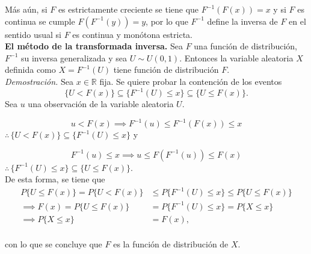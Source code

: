 \documentclass[10pt,a4paper]{article}
\begin{document}
Más aún, si $F$ es estrictamente creciente se tiene que $F^{-1}(F(x)) = x$ y si $F$ es continua se cumple $F(F^{-1}(y)) = y$, por lo que $F^{-1}$ define la inversa de $F$ en el sentido usual si $F$ es continua y monótona estricta.\\

\textbf{El método de la transformada inversa.} Sea $F$ una función de distribución, $F^{-1}$ su inversa generalizada y sea $U\sim U(0,1)$. Entonces la variable aleatoria $X$ definida como $X = F^{-1}(U)$ tiene función de distribución $F$.\\

\textit{Demostración.} Sea $x\in \mathbb{R}$ fija. Se quiere probar la contención de los eventos $$\{U<F(x)\}\subseteq\{F^{-1}(U)\leq x\}\subseteq\{U\leq F(x)\}.$$ Sea $u$ una observación de la variable aleatoria $U$.

$$u<F(x) \implies F^{-1}(u) \leq F^{-1}(F(x)) \leq x$$
$\therefore \hspace{2pt} \{U<F(x)\} \subseteq\{F^{-1}(U)\leq x\}$ y


$$F^{-1}(u)\leq x \implies u\leq F(F^{-1}(u))\leq F(x)$$
$\therefore \hspace{2pt} \{F^{-1}(U)\leq x\}\subseteq \{U \leq F(x)\}$.\\

De esta forma, se tiene que 
\begin{align*}
P\{U\leq F(x)\} = P\{U<F(x)\} &\leq P\{F^{-1}(U)\leq x\} \leq P\{U \leq F(x)\}\\
\implies F(x) = P\{U \leq F(x)\} &= P\{F^{-1}(U)\leq x\} = P\{X\leq x\}\\
\implies P\{X \leq x\} &= F(x),\\
\end{align*}

con lo que se concluye que $F$ es la función de distribución de $X$.
\end{document}
